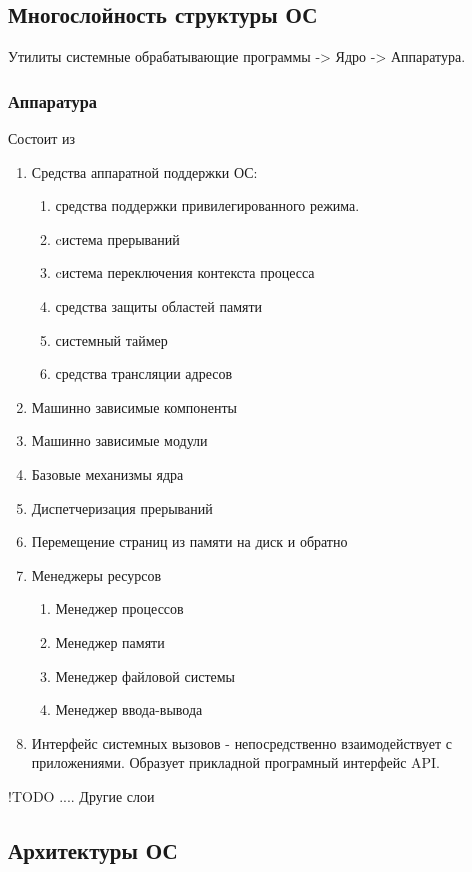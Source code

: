 \documentclass[a4paper]{article}
\begin{document}
\subsection{Многослойность структуры ОС}
Утилиты системные обрабатывающие программы -> Ядро -> Аппаратура.

\subsubsection{Аппаратура}
Состоит из
\begin{enumerate}
\item Средства аппаратной поддержки ОС:
    \begin{enumerate}
        \item средства поддержки привилегированного режима. 
        \item cистема прерываний
        \item cистема переключения контекста процесса
        \item средства защиты областей памяти
        \item системный таймер
        \item средства трансляции адресов
    \end{enumerate}
\item Машинно зависимые компоненты
\item Машинно зависимые модули
\item Базовые механизмы ядра
    
\item Диспетчеризация прерываний
\item Перемещение страниц из памяти на диск и обратно
\item Менеджеры ресурсов
\begin{enumerate}
    \item Менеджер процессов
    \item Менеджер памяти
    \item Менеджер файловой системы
    \item Менеджер ввода-вывода
\end{enumerate}
\item Интерфейс системных вызовов - непосредственно взаимодействует с приложениями. Образует прикладной програмный интерфейс API.
\end{enumerate}

!TODO .... Другие слои

\subsection{Архитектуры ОС}
\end{document}
